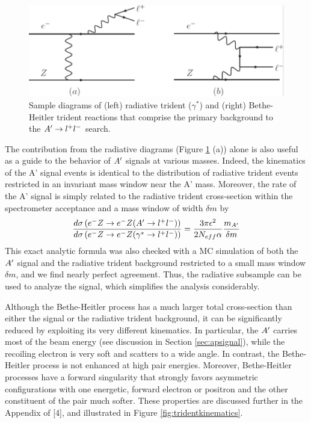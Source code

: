 \begin{figure}
\includegraphics[scale=1]{measurements/rad-bh-diagrams.pdf}
\caption{Sample diagrams of (left) radiative trident ($\gamma^*$) and (right) Bethe-Heitler trident reactions that comprise the primary background to the $A^\prime\rightarrow l^+l^-$  search.}
\label{fig:radbhdiagram}
\end{figure}

The contribution from the radiative diagrams (Figure \ref{fig:radbhdiagram} (a)) alone is also useful as a guide to the behavior of $A^\prime$ signals at various masses. Indeed, the kinematics of the A' signal events is identical to the distribution of radiative trident events restricted in an invariant mass window near the A' mass. Moreover, the rate of the A' signal is simply related to the radiative trident cross-section within the spectrometer acceptance and a mass window of width $\delta m$ by \cite{4}
\begin{equation}
\frac{d\sigma\left(e^- Z \rightarrow e^- Z(A^\prime\rightarrow l^+l^-)\right)}{d\sigma\left(e^- Z \rightarrow e^- Z(\gamma^*\rightarrow l^+l^-)\right)}=\frac{3\pi\epsilon^2}{2 N_{eff}\alpha}\frac{m_{A^\prime}}{\delta m}
\end{equation}
This exact analytic formula was also checked with a MC simulation of both the $A^\prime$ signal and the radiative trident background restricted to a small mass window $\delta m$, and we find nearly perfect agreement. Thus, the radiative subsample can be used to analyze the signal, which simplifies the analysis considerably.

 Although the Bethe-Heitler process has a much larger total cross-section than either the signal or the radiative trident background, it can be significantly reduced by exploiting its very different kinematics. In particular, the $A^\prime$ carries most of the beam energy (see discussion in Section \ref{sec:apsignal}), while the recoiling electron is very soft and scatters to a wide angle. In contrast, the Bethe-Heitler process is not enhanced at high pair energies. Moreover, Bethe-Heitler processes have a forward singularity that strongly favors asymmetric configurations with one energetic, forward electron or positron and the other constituent of the pair much softer.
These properties are discussed further in the Appendix of [4], and illustrated in Figure \ref{fig:tridentkinematics}.

